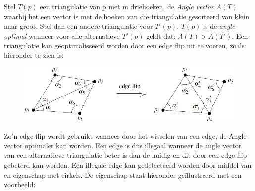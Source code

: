 \documentclass[12pt,a4paper]{article}
\begin{document}
	Stel $T(p)$ een triangulatie van p met m driehoeken, de \textit{Angle vector} $A(T)$ waarbij het een vector is met de hoeken van die triangulatie gesorteerd van klein naar groot. Stel dan een andere triangulatie voor $T'(p)$. $T(p)$ is de \textit{angle optimal} wanneer voor alle alternatieve $T'(p)$ geldt dat: $A(T) > A(T')$. Een triangulatie kan geoptimalisseerd worden door een edge flip uit te voeren, zoals hieronder te zien is: 
	\begin{figure}[H]
		\centering
		\includegraphics[width=0.9\linewidth]{afbeeldingen/delaunay/edge-flip}
		\label{fig:edge-flip}
	\end{figure}

	Zo'n edge flip wordt gebruikt wanneer door het wisselen van een edge, de Angle vector optimaler kan worden. Een edge is dus illegaal wanneer de angle vector van een alternatieve triangulatie beter is dan de huidig en dit door een edge flip gebeterd kan worden. Een illegale edge kan gedetecteerd worden door middel van en eigenschap met cirkels. De eigenschap staat hieronder geïllustreerd met een voorbeeld: 
	\begin{figure}[H]
		\centering
		\label{fig:illegal-edges}
	\end{figure}
\end{document}
